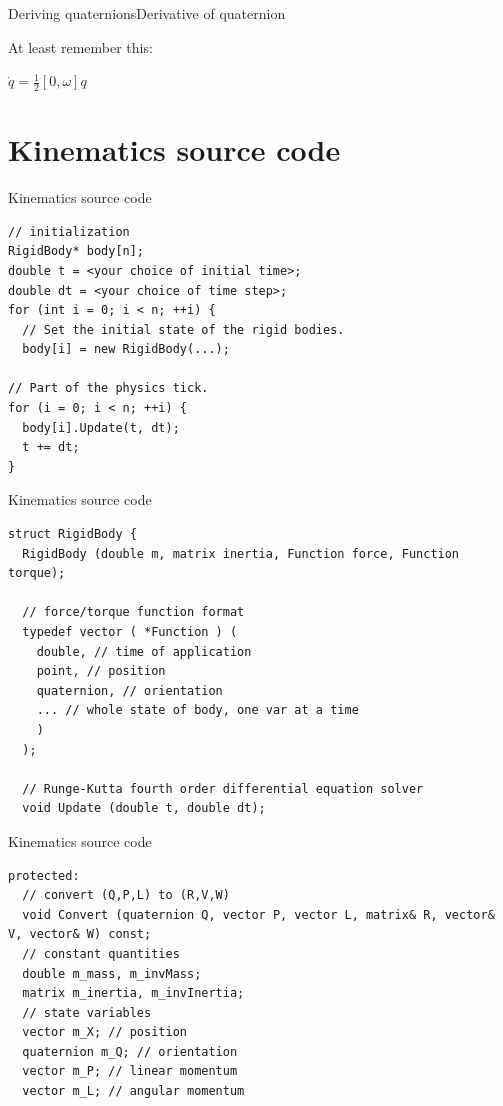 \documentclass{beamer}
\begin{document}
\begin{slide}{Deriving quaternions}{Derivative of quaternion}{
\item At least remember this:
\item $\dot q = \frac{1}{2} [0, \omega] q$
}\end{slide}

\section{Kinematics source code}
\begin{frame}[fragile]{Kinematics source code}
\begin{lstlisting}
// initialization 
RigidBody* body[n]; 
double t = <your choice of initial time>; 
double dt = <your choice of time step>; 
for (int i = 0; i < n; ++i) { 
  // Set the initial state of the rigid bodies. 
  body[i] = new RigidBody(...);

// Part of the physics tick. 
for (i = 0; i < n; ++i) { 
  body[i].Update(t, dt);
  t += dt;
}
\end{lstlisting}
\end{frame}

\begin{frame}[fragile]{Kinematics source code}
\begin{lstlisting}
struct RigidBody {
  RigidBody (double m, matrix inertia, Function force, Function torque);

  // force/torque function format 
  typedef vector ( *Function ) (
    double, // time of application
    point, // position
    quaternion, // orientation
    ... // whole state of body, one var at a time
    )
  );

  // Runge-Kutta fourth order differential equation solver 
  void Update (double t, double dt);
\end{lstlisting}
\end{frame}

\begin{frame}[fragile]{Kinematics source code}
\begin{lstlisting}
protected: 
  // convert (Q,P,L) to (R,V,W) 
  void Convert (quaternion Q, vector P, vector L, matrix& R, vector& V, vector& W) const;
  // constant quantities 
  double m_mass, m_invMass; 
  matrix m_inertia, m_invInertia;
  // state variables 
  vector m_X; // position 
  quaternion m_Q; // orientation 
  vector m_P; // linear momentum 
  vector m_L; // angular momentum
\end{lstlisting}
\end{frame}
\end{document}

